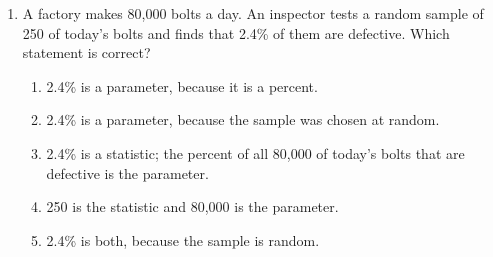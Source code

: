 \documentclass[12pt]{article}
\begin{document}
\begin{enumerate}[leftmargin=1.9em, itemsep=0.13in]
        \vspace{3pt}
        {\centering
        \par}
        \vspace{1pt}

        Which statement is true?\hfill{}\rule[-0.2in]{0pt}{0.48in}
        \begin{enumerate}[label=\textbf{(\Alph*)}, leftmargin=2.2em, itemsep=2pt]
          \item More customers waited 24 to 40 minutes than 12 to 15, because that whisker is
                longer.
          \item About half of the customers waited more than 24 minutes.
          \item The mean wait was 15 minutes.
          \item No customer waited more than 24 minutes.
          \item About 15 customers waited 12 to 15 minutes, and about 15 waited 24 to 40.
        \end{enumerate}

  \boxguard[11]
  \item A factory makes 80{,}000 bolts a day. An inspector tests a random sample of 250 of
        today's bolts and finds that 2.4\% of them are defective. Which statement is correct?
        \begin{enumerate}[label=\textbf{(\Alph*)}, leftmargin=2.2em, itemsep=2pt]
          \item 2.4\% is a parameter, because it is a percent.
          \item 2.4\% is a parameter, because the sample was chosen at random.
          \item 2.4\% is a statistic; the percent of all 80{,}000 of today's bolts that are\\
                defective is the parameter.
          \item 250 is the statistic and 80{,}000 is the parameter.
          \item 2.4\% is both, because the sample is random.\hfill{}\rule[-0.2in]{0pt}{0.48in}
        \end{enumerate}


\end{enumerate}
\end{document}
